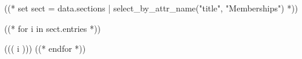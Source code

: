 \documentclass[10pt, letterpaper]{awesome-cv}
\begin{document}
((* set sect = data.sections | select_by_attr_name("title", "Memberships") *))
\begin{cventries}
\begin{cvitems}
  ((* for i in sect.entries *))
  \item{((( i )))}
  ((* endfor *))
\end{cvitems}
\end{cventries}

\end{document}
